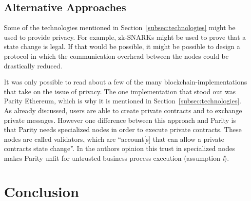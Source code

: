 \documentclass[runningheads]{llncs}
\newcommand{\comment}[1]{}
\newcommand{\ber}[1]{\textit{#1}}
\newcommand{\refsec}[1]{Section~\ref{#1}}
\newcommand{\quotel}{``}
\newcommand{\quoter}{''}
\begin{document}
\subsection{Alternative Approaches} \label{subsec:alternative}

Some of the technologies mentioned in \refsec{subsec:technologies} might be used to provide privacy. For example, zk-SNARKs might be used to prove that a state change is legal. If that would be possible, it might be possible to design a protocol in which the communication overhead between the nodes could be drastically reduced. 


It was only possible to read about a few of the many block\-chain-im\-ple\-men\-ta\-tions that take on the issue of privacy. The one implementation that stood out was Parity Ethereum, which is why it is mentioned in \refsec{subsec:technologies}. As already discussed, users are able to create private contracts and to exchange private messages. However one difference between this approach and Parity is that Parity needs specialized nodes in order to execute private contracts. These nodes are called validators, which are \quotel account[s] that can allow a private contracts state change\quoter  \cite{parity}. In the authors opinion this trust in specialized nodes makes Parity unfit for untrusted business process execution (assumption \ber{l}).

\comment{
We would also like to mention Parity Ethereum. With Parity, users are able to hide private contracts in public contracts  and to exchange private messages. However for private contract execution Parity is relying on validators, \quotel account[s] that can allow a private contract's state change\quoter  \cite{parity}. In our understanding this makes Parity unfit for for untrusted business process execution, since, like private blockchains, it requires trust in one or multiple nodes.

\todo{Parity comparison}
}
\section{Conclusion} \label{sec:conclusion}

\comment{
\begin{itemize}
    \item How could mentioned in \refsec{subsec:technologies} improve \refsec{sec:eval}?
    \item How did it work out in the end? 
\end{itemize}}
\end{document}
